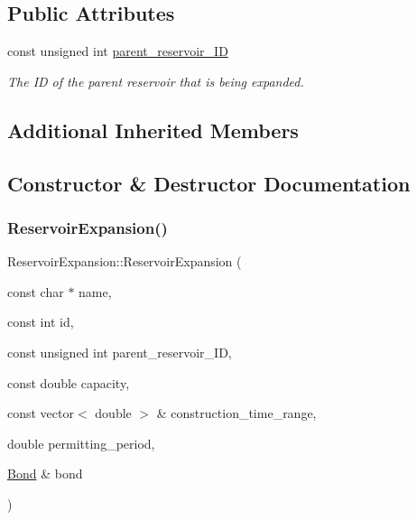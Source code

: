 \subsection*{Public Attributes}
\begin{DoxyCompactItemize}
\item 
const unsigned int \mbox{\hyperlink{classReservoirExpansion_a56527196174404cfed20b863df2ab0ba}{parent\+\_\+reservoir\+\_\+\+ID}}
\begin{DoxyCompactList}\small\item\em The ID of the parent reservoir that is being expanded. \end{DoxyCompactList}\end{DoxyCompactItemize}
\subsection*{Additional Inherited Members}


\subsection{Constructor \& Destructor Documentation}
\mbox{\label{classReservoirExpansion_aa742cae4276e97847681dac4f828b5ae}} 
\subsubsection{\texorpdfstring{Reservoir\+Expansion()}{ReservoirExpansion()}\hspace{0.1cm}{\footnotesize\ttfamily [1/2]}}
{\footnotesize\ttfamily Reservoir\+Expansion\+::\+Reservoir\+Expansion (\begin{DoxyParamCaption}\item[{const char $\ast$}]{name,  }\item[{const int}]{id,  }\item[{const unsigned int}]{parent\+\_\+reservoir\+\_\+\+ID,  }\item[{const double}]{capacity,  }\item[{const vector$<$ double $>$ \&}]{construction\+\_\+time\+\_\+range,  }\item[{double}]{permitting\+\_\+period,  }\item[{\mbox{\hyperlink{classBond}{Bond}} \&}]{bond }\end{DoxyParamCaption})}



